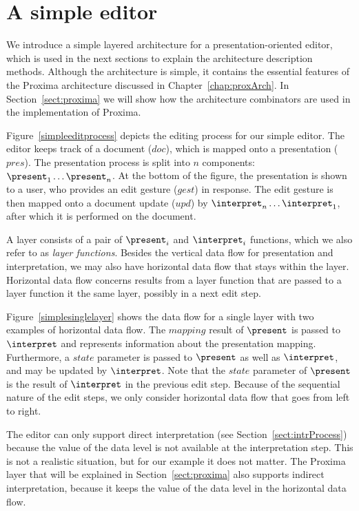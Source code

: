 %																
%																
%																
\section{A simple editor}


We introduce a simple layered architecture for a presentation-oriented editor, which is used in the next sections to explain the architecture description methods. Although the architecture is simple, it contains the essential features of the Proxima architecture discussed in Chapter~\ref{chap:proxArch}. In Section~\ref{sect:proxima} we will show how the architecture combinators are used in the implementation of Proxima.

Figure~\ref{simpleeditprocess} depicts the editing process for our simple editor. The editor keeps track of a document ($doc$), which is mapped onto a presentation ($pres$). The presentation process is split into $n$ components: $\present_1 \dots \present_n$. At the bottom of the figure, the presentation is shown to a user, who provides an edit gesture ($gest$) in response. The edit gesture is then mapped onto a document update ($upd$) by $\interpret_n \dots \interpret_1$, after which it is performed on the document.


A layer consists of a pair of $\present_i$ and $\interpret_i$ functions, which we also refer to as {\em layer functions}. Besides the vertical data flow for presentation and interpretation, we may also have horizontal data flow that stays within the layer. Horizontal data flow concerns results from a layer function that are passed to a layer function it the same layer, possibly in a next edit step.

Figure~\ref{simplesinglelayer} shows the data flow for a single layer with two examples of horizontal data flow. The $mapping$ result of $\present$ is passed to $\interpret$ and represents information about the presentation mapping. Furthermore, a $state$ parameter is passed to $\present$ as well as $\interpret$, and may be updated by $\interpret$. Note that the $state$ parameter of $\present$ is the result of $\interpret$ in the previous edit step. Because of the sequential nature of the edit steps, we only consider horizontal data flow that goes from left to right.

The editor can only support direct interpretation (see Section~\ref{sect:intrProcess}) because the value of the data level is not available at the interpretation step. This is not a realistic situation, but for our example it does not matter. The Proxima layer that will be explained in Section~\ref{sect:proxima} also supports indirect interpretation, because it keeps the value of the data level in the horizontal data flow.

